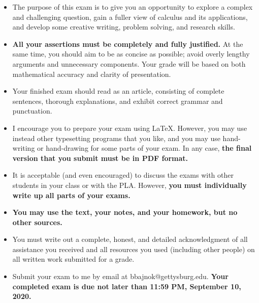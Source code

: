 \documentclass[12pt]{article}
\begin{document}
\begin{itemize}
  
\item The purpose of this exam is to give you an opportunity to explore a complex and challenging question, gain a fuller view of calculus and its applications, and develop some creative writing, problem solving, and research skills.

\item  {\bf All your assertions must be completely and fully justified.} At the same time, you should aim to be as concise as possible; avoid overly lengthy arguments and unnecessary components.  Your grade will be based on both mathematical accuracy and clarity of presentation.

\item 
Your finished exam should read as an article, consisting of complete sentences, thorough explanations, and exhibit correct grammar and punctuation.

\item I encourage you to prepare your exam using LaTeX.  However, you may use instead other typesetting programs that you like, and you may use hand-writing or hand-drawing for some parts of your exam.  In any case, {\bf the final version that you submit must be in PDF format.}  

\item It is acceptable (and even encouraged) to discuss the exams with other students in your class or with the PLA.  However,  {\bf  you must individually write up all parts of your exams.}

\item {\bf You may use the text, your notes, and your homework, but no other sources.}
 
\item You must write out a complete, honest, and detailed acknowledgment of all assistance you received and all resources you used (including other people) on all written work submitted for a grade.

\item Submit your exam to me by email at bbajnok@gettysburg.edu.  {\bf Your completed exam is due not later than 11:59 PM, September 10, 2020.}







\end{itemize}

\end{document}
